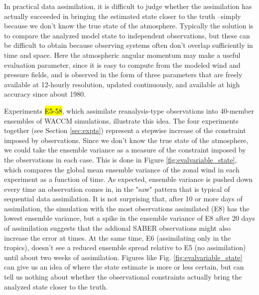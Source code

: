 In practical data assimilation, it is difficult to judge whether the assimilation has actually succeeded in bringing the estimated state closer to the truth --simply because we don't know the true state of the atmosphere.
Typically the solution is to compare the analyzed model state to independent observations, but these can be difficult to obtain because observing systems often don't overlap sufficiently in time and space.
Here the atmospheric angular momentum may make a useful evaluation parameter, since it is easy to compute from the modeled wind and pressure fields, and is observed in the form of three parameters that are freely available at 12-hourly resolution, updated continuously, and available at high accuracy since about 1980.  

Experiments \hl{E5-58}, which assimilate reanalysis-type observations into 40-member ensembles of WACCM simulations, illustrate this idea.  
The four experiments together (see Section  \ref{sec:expts}) represent a stepwise increase of the constraint imposed by observations.
Since we don't know the true state of the atmosphere, we could take the ensemble variance as a measure of the constraint imposed by the observations in each case. 
This is done in Figure \ref{fig:evalvariable_state}, which compares 
the global mean ensemble variance of the zonal wind in each experiment as a function of time.  
As expected, ensemble variance is pushed down every time an observation comes in, in the "saw" pattern that is typical of sequential data assimilation. 
It is not surprising that, after 10 or more days of assimilation, the simulation with the most observations assimilated (E8) has the lowest ensemble variance, but a spike in the ensemble variance of E8 after 20 days of assimilation suggests that the addional SABER observations might also increase the error at times. 
At the same time, E6 (assimilating only in the tropics), doesn't see a reduced ensemble spread relative to E5 (no assimilation) until about two weeks of assimilation.  
Figures like Fig.  \ref{fig:evalvariable_state} can give us an idea of where the state estimate is more or less certain, but can tell us nothing about 
whether the observational constraints actually bring the analyzed state closer to the truth. 


